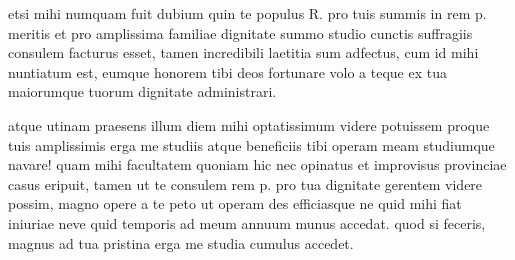 


 etsi mihi numquam fuit dubium quin te populus R. pro tuis summis in rem p. meritis et pro amplissima familiae dignitate summo studio cunctis suffragiis consulem facturus esset, tamen incredibili laetitia sum adfectus, cum id mihi nuntiatum est, eumque honorem tibi deos fortunare volo a teque ex tua maiorumque tuorum dignitate administrari.

 atque utinam praesens illum diem mihi optatissimum videre potuissem proque tuis amplissimis erga me studiis atque beneficiis tibi operam meam studiumque navare! quam mihi facultatem quoniam hic nec opinatus et improvisus provinciae casus eripuit, tamen ut te consulem rem p. pro tua dignitate gerentem videre possim, magno opere a te peto ut operam des efficiasque ne quid mihi fiat iniuriae neve quid temporis ad meum annuum munus accedat. quod si feceris, magnus ad tua pristina erga me studia cumulus accedet.
